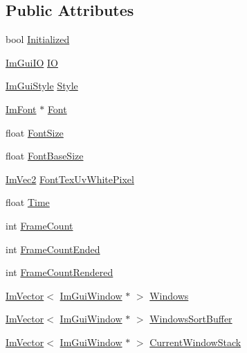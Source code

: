 \subsection*{Public Attributes}
\begin{DoxyCompactItemize}
\item 
bool \hyperlink{struct_im_gui_context_a71b32432f5c4658b4772b293640a66c0}{Initialized}
\item 
\hyperlink{struct_im_gui_i_o}{Im\+Gui\+IO} \hyperlink{struct_im_gui_context_add4fdcc8c6a437d8f8e7c837418be83c}{IO}
\item 
\hyperlink{struct_im_gui_style}{Im\+Gui\+Style} \hyperlink{struct_im_gui_context_a2e682502e1a3d2c399171dd3c4fc969d}{Style}
\item 
\hyperlink{struct_im_font}{Im\+Font} $\ast$ \hyperlink{struct_im_gui_context_aec64e774018a7d74515baeb9e06fb4e3}{Font}
\item 
float \hyperlink{struct_im_gui_context_af4022d1866887cdc400131fc6a65b200}{Font\+Size}
\item 
float \hyperlink{struct_im_gui_context_a0fcbda57d25b80111283ed7305ee3ee8}{Font\+Base\+Size}
\item 
\hyperlink{struct_im_vec2}{Im\+Vec2} \hyperlink{struct_im_gui_context_a39aec37f209c91a4e4f503bd2e365081}{Font\+Tex\+Uv\+White\+Pixel}
\item 
float \hyperlink{struct_im_gui_context_a88ebae89e11da57e4567767694f7576f}{Time}
\item 
int \hyperlink{struct_im_gui_context_ab9a1f3b3f15f0a6c5f29aef85f1a8ea2}{Frame\+Count}
\item 
int \hyperlink{struct_im_gui_context_aa4cc3099c789be981d665c617b6d78a9}{Frame\+Count\+Ended}
\item 
int \hyperlink{struct_im_gui_context_a64a96ecd43f4b10c1fec8eb3fc9bff89}{Frame\+Count\+Rendered}
\item 
\hyperlink{class_im_vector}{Im\+Vector}$<$ \hyperlink{struct_im_gui_window}{Im\+Gui\+Window} $\ast$ $>$ \hyperlink{struct_im_gui_context_a0f59a9a861d097be066c6cc106e40f3e}{Windows}
\item 
\hyperlink{class_im_vector}{Im\+Vector}$<$ \hyperlink{struct_im_gui_window}{Im\+Gui\+Window} $\ast$ $>$ \hyperlink{struct_im_gui_context_af33de778de28b057fa7a42e4cbe0017a}{Windows\+Sort\+Buffer}
\item 
\hyperlink{class_im_vector}{Im\+Vector}$<$ \hyperlink{struct_im_gui_window}{Im\+Gui\+Window} $\ast$ $>$ \hyperlink{struct_im_gui_context_a19020a20e7bca2fadbb287106b92891b}{Current\+Window\+Stack}
\item 

\end{DoxyCompactItemize}
